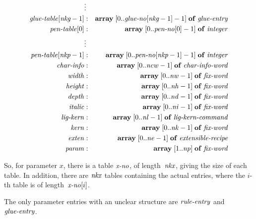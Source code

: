 \documentclass[fleqn]{article}
\newcommand{\myit}[1]{\mbox{\emph{#1}}}
\begin{document}
\begin{eqnarray*}
& \vdots\\
\myit{glue-table}[\textit{nkg}-1] & : &
     \mathbf{array}\;[0..\myit{glue-no}[\textit{nkg}-1]-1]\;
     \mathbf{of}\;\myit{glue-entry}\\
\myit{pen-table}[0] & : &
     \mathbf{array}\;[0..\myit{pen-no}[0]-1]\;
     \mathbf{of}\;\myit{integer}\\
& \vdots\\
\myit{pen-table}[\textit{nkp}-1] & : &
     \mathbf{array}\;[0..\myit{pen-no}[\textit{nkp}-1]-1]\;
     \mathbf{of}\;\myit{integer}\\
\myit{char-info} & : &
     \mathbf{array}\;[0..\myit{ncw}-1]\;\mathbf{of}\;
     \myit{char-info-word}\\
\myit{width} & : &
     \mathbf{array}\;[0..\myit{nw}-1]\;\mathbf{of}\;\myit{fix-word}\\
\myit{height} & : &
     \mathbf{array}\;[0..\myit{nh}-1]\;\mathbf{of}\;\myit{fix-word}\\
\myit{depth} & : &
     \mathbf{array}\;[0..\myit{nd}-1]\;\mathbf{of}\;\myit{fix-word}\\
\myit{italic} & : &
     \mathbf{array}\;[0..\myit{ni}-1]\;\mathbf{of}\;\myit{fix-word}\\
\myit{lig-kern} & : &
     \mathbf{array}\;[0..\myit{nl}-1]\;\mathbf{of}\;
     \myit{lig-kern-command}\\
\myit{kern} & : &
     \mathbf{array}\;[0..\myit{nk}-1]\;\mathbf{of}\;\myit{fix-word}\\
\myit{exten} & : &
     \mathbf{array}\;[0..\myit{ne}-1]\;\mathbf{of}\;
     \myit{extensible-recipe}\\
\myit{param} & : &
     \mathbf{array}\;[1..\myit{np}]\;\mathbf{of}\;\myit{fix-word}
\end{eqnarray*}

So, for parameter $x$, there is a table $\myit{x-no}$, of
length~$\myit{nkx}$, giving the size of each table.
In addition, there are $\myit{nkx}$ tables
containing the actual entries, where the $i$-th table is of
length~$\myit{x-no}[i]$.

The only parameter entries with an unclear structure are
$\myit{rule-entry}$ and $\myit{glue-entry}$.
\end{document}
